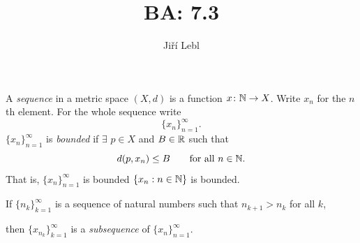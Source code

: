 \documentclass[10pt,aspectratio=149]{beamer}
\author{Ji\v{r}\'i Lebl}
\institute[OSU]{%
Departemento pri Matematiko de Oklahoma {\^S}tata Universitato}
\title{BA: 7.3}
\date{}
\begin{document}
\begin{frame}
\titlepage
\end{frame}

\begin{frame}
\begin{definition}
A \emph{sequence} in a metric space $(X,d)$ is a function
$x \colon {\mathbb{N}} \to X$.
\pause
Write $x_n$ for the $n$th element.
\pause
For the whole sequence write
\begin{equation*}
\{ x_n \}_{n=1}^\infty .
\end{equation*}
\pause
$\{ x_n \}_{n=1}^\infty$ is \emph{bounded} if
$\exists$ $p \in X$ and $B \in {\mathbb{R}}$ such that
\begin{equation*}
d(p,x_n) \leq B \qquad \text{for all } n \in {\mathbb{N}}.
\end{equation*}
\pause
That is, $\{x_n\}_{n=1}^\infty$ is bounded \wiffif
$\{ x_n : n \in {\mathbb{N}} \}$ is bounded.

\pause
\medskip

If $\{ n_k \}_{k=1}^\infty$ is a sequence of natural numbers
such that $n_{k+1} > n_k$ for all $k$,

then $\{ x_{n_k} \}_{k=1}^\infty$
is a \emph{subsequence} of $\{x_n \}_{n=1}^\infty$.
\end{definition}

\end{frame}
\end{document}
